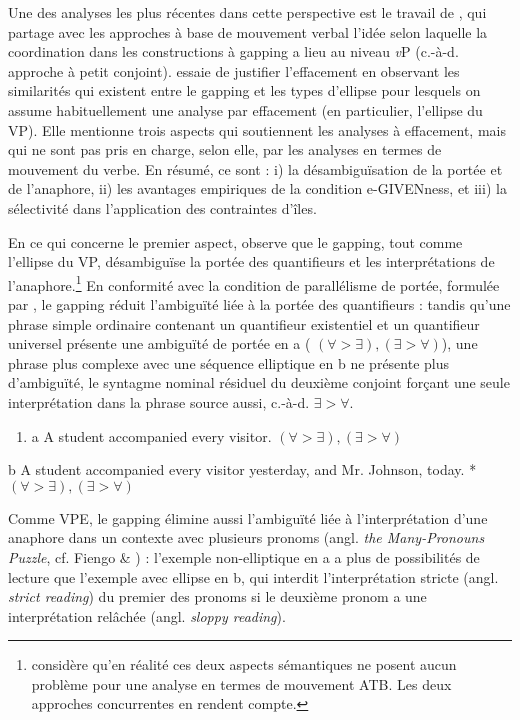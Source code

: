 Une des analyses les plus récentes dans cette perspective est le travail de \citet{Coppock2001}, qui partage avec les approches à base de mouvement verbal l'idée selon laquelle la coordination dans les constructions à gapping a lieu au niveau \textit{v}P (c.-à-d. approche à petit conjoint). \citet{Coppock2001} essaie de justifier l'effacement en observant les similarités qui existent entre le gapping et les types d'ellipse pour lesquels on assume habituellement une analyse par effacement (en particulier, l'ellipse du VP). Elle mentionne trois aspects qui soutiennent les analyses à effacement, mais qui ne sont pas pris en charge, selon elle, par les analyses en termes de mouvement du verbe. En résumé, ce sont : i) la désambiguïsation de la portée et de l'anaphore, ii) les avantages empiriques de la condition e-GIVENness, et iii) la sélectivité dans l'application des contraintes d'îles. 

En ce qui concerne le premier aspect, \citet{Coppock2001} observe que le gapping, tout comme l'ellipse du VP, désambiguïse la portée des quantifieurs et les interprétations de l'anaphore.\footnote{\citet{Johnson2009} considère qu'en réalité ces deux aspects sémantiques ne posent aucun problème pour une analyse en termes de mouvement ATB. Les deux approches concurrentes en rendent compte.} En conformité avec la condition de parallélisme de portée, formulée par \citet{Fox2000}, le gapping réduit l'ambiguïté liée à la portée des quantifieurs : tandis qu'une phrase simple ordinaire contenant un quantifieur existentiel et un quantifieur universel présente une ambiguïté de portée en a ( ${(\forall >\exists ),(\exists >\forall )}$), une phrase plus complexe avec une séquence elliptique en b ne présente plus d'ambiguïté, le syntagme nominal résiduel du deuxième conjoint forçant une seule interprétation dans la phrase source aussi, c.-à-d.  ${\exists >\forall} $.  


\begin{enumerate}
\item \label{bkm:Ref288587311}a   A student accompanied every visitor.  ${(\forall >\exists ),(\exists >\forall )}$  


\end{enumerate}
  b  A student accompanied every visitor yesterday, and Mr. Johnson, today. * ${(\forall >\exists ),(\exists >\forall )}$ 

Comme VPE, le gapping élimine aussi l'ambiguïté liée à l'interprétation d'une anaphore dans un contexte avec plusieurs pronoms (angl. \textit{the Many-Pronouns Puzzle}, cf. Fiengo \& \citet{May1994}) : l'exemple non-elliptique en a a plus de possibilités de lecture que l'exemple avec ellipse en b, qui interdit l'interprétation stricte (angl. \textit{strict reading}) du premier des pronoms si le deuxième pronom a une interprétation relâchée (angl. \textit{sloppy reading}). 


